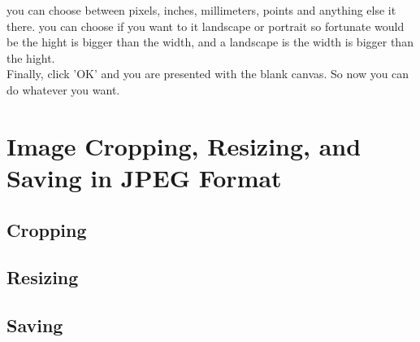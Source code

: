 you can choose between pixels, inches, millimeters, points and anything else it there.
you can choose if you want to it landscape or portrait so fortunate would be the hight is bigger than the width, and a landscape is the width is bigger than the hight.\\
Finally, click 'OK' and you are presented with the blank canvas. So now you can do whatever you want.

\section{Image Cropping, Resizing, and Saving in JPEG Format }
\subsection{Cropping}
\subsection{Resizing}
\subsection{Saving}